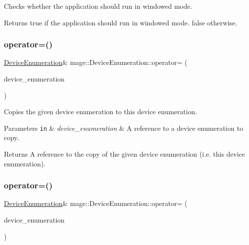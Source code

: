 Checks whether the application should run in windowed mode.

\begin{DoxyReturn}{Returns}
{\ttfamily true} if the application should run in windowed mode. {\ttfamily false} otherwise. 
\end{DoxyReturn}
\hypertarget{classmage_1_1_device_enumeration_a03e3affa2b8bb4837cffda7b11389bea}{}\label{classmage_1_1_device_enumeration_a03e3affa2b8bb4837cffda7b11389bea} 
\subsubsection{\texorpdfstring{operator=()}{operator=()}\hspace{0.1cm}{\footnotesize\ttfamily [1/2]}}
{\footnotesize\ttfamily \hyperlink{classmage_1_1_device_enumeration}{Device\+Enumeration}\& mage\+::\+Device\+Enumeration\+::operator= (\begin{DoxyParamCaption}\item[{const \hyperlink{classmage_1_1_device_enumeration}{Device\+Enumeration} \&}]{device\+\_\+enumeration }\end{DoxyParamCaption})\hspace{0.3cm}{\ttfamily [delete]}}

Copies the given device enumeration to this device enumeration.


\begin{DoxyParams}[1]{Parameters}
\mbox{\tt in}  & {\em device\+\_\+enumeration} & A reference to a device enumeration to copy. \\
\hline
\end{DoxyParams}
\begin{DoxyReturn}{Returns}
A reference to the copy of the given device enumeration (i.\+e. this device enumeration). 
\end{DoxyReturn}
\hypertarget{classmage_1_1_device_enumeration_accf36804bfe510cc8a4d8495854596d6}{}\label{classmage_1_1_device_enumeration_accf36804bfe510cc8a4d8495854596d6} 
\subsubsection{\texorpdfstring{operator=()}{operator=()}\hspace{0.1cm}{\footnotesize\ttfamily [2/2]}}
{\footnotesize\ttfamily \hyperlink{classmage_1_1_device_enumeration}{Device\+Enumeration}\& mage\+::\+Device\+Enumeration\+::operator= (\begin{DoxyParamCaption}\item[{\hyperlink{classmage_1_1_device_enumeration}{Device\+Enumeration} \&\&}]{device\+\_\+enumeration }\end{DoxyParamCaption})\hspace{0.3cm}{\ttfamily [delete]}}

